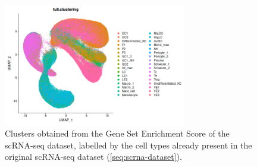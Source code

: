 \documentclass[aps,prb,twocolumn,superscriptaddress,floatfix,longbibliography]{revtex4-2}
\begin{document}
\begin{figure}[h]
\centering
\includegraphics[clip=true,width=8cm]{img/healthy-ES-cells.png}
\caption{Clusters obtained from the Gene Set Enrichment Score of the scRNA-seq dataset, labelled by the cell types already present in the original scRNA-seq dataset (\ref{seq:scrna-dataset}).}
\label{fig:scrna-es-cells}
\end{figure}
\end{document}
